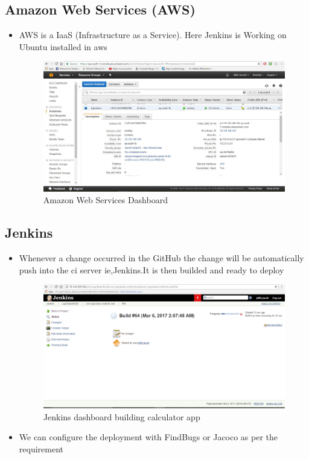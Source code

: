 \documentclass[12pt,a4paper,oneside]{report}
\begin{document}
{\subsection{Amazon Web Services (AWS)}
\begin{itemize}
\item \par AWS is a IaaS (Infrastructure as a Service).
Here Jenkins is Working on Ubuntu installed in aws 
\begin{figure}[h]
\begin{center}
\includegraphics[scale=.47]{aws.png}
\caption{Amazon Web Services Dashboard}
\label{Amazon Web Services Dashboard}
\end{center}
\end{figure}
\end{itemize}
\pagebreak
\newpage
\subsection{Jenkins}
\begin{itemize}

\item \par Whenever a change occurred in the GitHub the change will be automatically push into the ci server ie,Jenkins.It is then builded and ready to deploy
\begin{figure}[h]
\begin{center}
\includegraphics[scale=.47]{jnks.png}
\caption{Jenkins dashboard building calculator app}
\label{Jenkins dashboard building calculator app}
\end{center}
\end{figure}
\item \par We can configure the deployment with FindBugs or Jacoco as per the requirement
\newpage

\end{itemize}}
\end{document}

